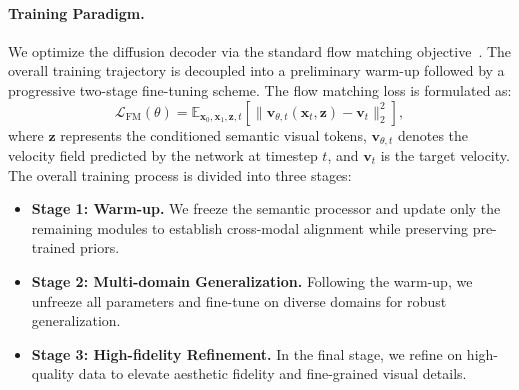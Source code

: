 \paragraph{Training Paradigm.} 
We optimize the diffusion decoder via the standard flow matching objective~\citep{lipman2022flow}. The overall training trajectory is decoupled into a preliminary warm-up followed by a progressive two-stage fine-tuning scheme. The flow matching loss is formulated as:
\begin{equation}
    \mathcal{L}_{\text{FM}}(\theta) = \mathbb{E}_{\bm{x}_0, \bm{x}_1, \bm{z}, t} \left[ \| \bm{v}_{\theta,t}(\bm{x}_t, \bm{z}) - \bm{v}_{t} \|^2_2 \right],
\end{equation}
where $\bm{z}$ represents the conditioned semantic visual tokens, $\bm{v}_{\theta,t}$ denotes the velocity field predicted by the network at timestep $t$, and $\bm{v}_{t}$ is the target velocity. 
The overall training process is divided into three stages:
\begin{itemize}[leftmargin=16pt]
    \item \textbf{Stage 1: Warm-up.} We freeze the semantic processor and update only the remaining modules to establish cross-modal alignment while preserving pre-trained priors.

    \item \textbf{Stage 2: Multi-domain Generalization.} Following the warm-up, we unfreeze all parameters and
    fine-tune on diverse domains for robust generalization.

    \item \textbf{Stage 3: High-fidelity Refinement.} 
    In the final stage, we refine on high-quality data to elevate aesthetic fidelity and fine-grained visual details.
\end{itemize}

